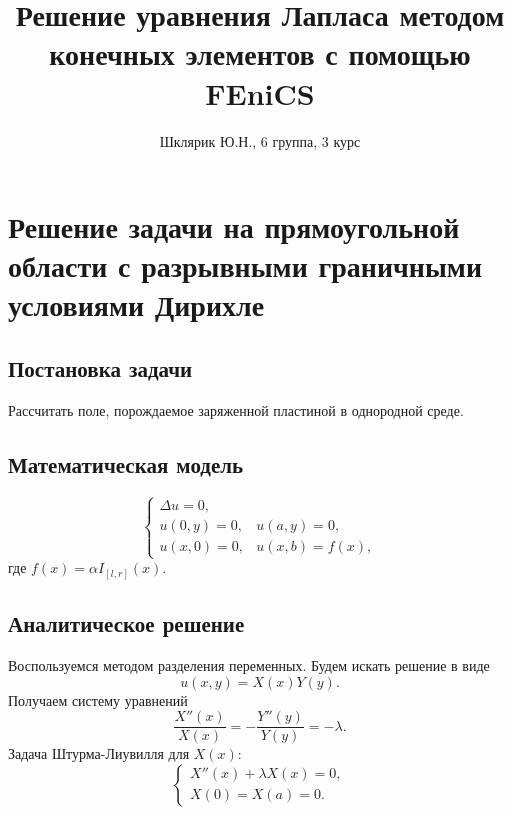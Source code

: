 \documentclass{report}
\title{Решение уравнения Лапласа методом конечных элементов с помощью FEniCS}
\author{Шклярик Ю.Н., 6 группа, 3 курс}
\date{}
\begin{document}
\maketitle

\chapter{Решение задачи на прямоугольной области с разрывными граничными условиями Дирихле}

\section{Постановка задачи}
Рассчитать поле, порождаемое заряженной пластиной в однородной среде.

\section{Математическая модель}
\begin{equation}
	\begin{cases}
		\Delta u = 0, \\
		u(0, y) = 0,&u(a, y)=0,\\
		u(x, 0) = 0,&u(x, b)=f(x),
	\end{cases}
\end{equation}
где $f(x) = \alpha I_{[l,r]}(x)$.

\section{Аналитическое решение}
Воспользуемся методом разделения переменных. Будем искать решение в виде
\begin{equation*}
	u(x,y) = X(x)Y(y).
\end{equation*}
Получаем систему уравнений
\begin{equation}
	\frac{X''(x)}{X(x)}=-\frac{Y''(y)}{Y(y)}=-\lambda.
\end{equation}
Задача Штурма-Лиувилля для $X(x)$:
\begin{equation}\label{sl1}
	\begin{cases}
		X''(x)+\lambda X(x)=0,\\
		X(0)=X(a)=0.
	\end{cases}
\end{equation}
\end{document}
